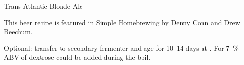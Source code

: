 \begin{recipe}{Trans-Atlantic Blonde Ale}

\begin{aboutblock}
This beer recipe is featured in Simple Homebrewing by Denny Conn and Drew Beechum.
\sourceaha
\end{aboutblock}


\begin{methodandtiming}
 
\begin{mashsteps}
\end{mashsteps}

\begin{fermentationsteps}
\end{fermentationsteps}

\begin{directions}
Optional: transfer to secondary fermenter and age for 10--14 days at
. For 7~\% ABV  of dextrose could be added during
the boil.
\end{directions}

\end{methodandtiming}

\recipebreak

\begin{ingredientsblock}

\begin{malts}
\end{malts}

\begin{hops}
\end{hops}


\end{ingredientsblock}

\end{recipe}
